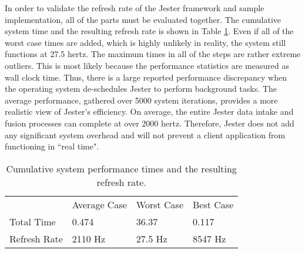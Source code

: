 In order to validate the refresh rate of the Jester framework and sample implementation, all of the parts must be evaluated together. The cumulative system time and the resulting refresh rate is shown in Table \ref{tab:total}. Even if all of the worst case times are added, which is highly unlikely in reality, the system still functions at 27.5 hertz. The maximum times in all of the steps are rather extreme outliers. This is most likely because the performance statistics are measured as wall clock time. Thus, there is a large reported performance discrepancy when the operating system de-schedules Jester to perform background tasks. The average performance, gathered over 5000 system iterations, provides a more realistic view of Jester's efficiency. On average, the entire Jester data intake and fusion processes can complete at over 2000 hertz. Therefore, Jester does not add any significant system overhead and will not prevent a client application from functioning in ``real time".

\begin{table}[h]
\begin{tabular}{llll}
             & Average Case & Worst Case & Best Case \\
Total Time   & 0.474        & 36.37      & 0.117     \\
Refresh Rate & 2110 Hz      & 27.5 Hz    & 8547 Hz  
\end{tabular}
\caption{Cumulative system performance times and the resulting refresh rate.}
\label{tab:total}
\end{table}

